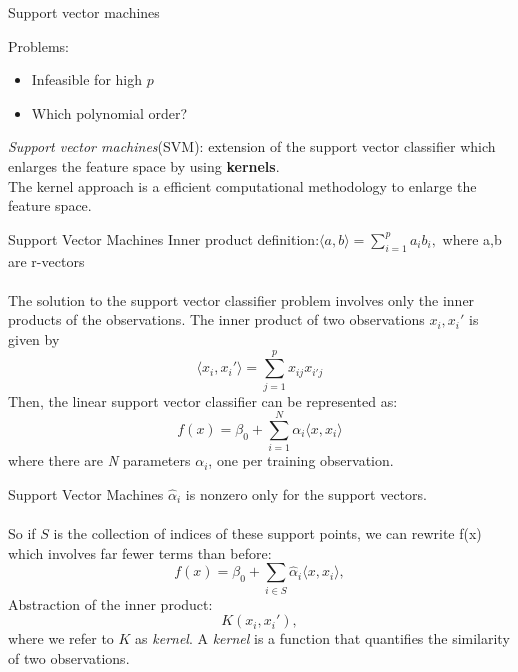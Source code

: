 \documentclass[notes]{beamer}          %
\begin{document}
\begin{frame}{Support vector machines}

Problems:
\begin{itemize}
	\item Infeasible for high $p$
	\item Which polynomial order?
\end{itemize}
\vspace{0.5cm}
\textit{Support vector machines}(SVM): extension of the support vector classifier which enlarges the feature space by using \textbf{kernels}.\\
\vspace{0.5cm}
The kernel approach is a efficient computational methodology to enlarge the feature space.


\end{frame}

\begin{frame}{Support Vector Machines}
Inner product definition:$\langle {a,b} \rangle = \sum_{i=1}^{p} a_{i}b_{i},$ where a,b are r-vectors\\~\\
The solution to the support vector classifier problem involves only the inner products of the observations. The inner product of two observations $x_i, x_i'$ is given by
\begin{equation*}
\langle {x_i,x_i'} \rangle = \sum_{j=1}^{p} x_{ij} x_{i'j}
\end{equation*}
Then, the linear support vector classifier can be represented as:
\begin{equation*}
f(x) = \beta_0 + \sum_{i=1}^{N} \alpha_i \langle {x,x_i} \rangle
\end{equation*}
where there are \textit{N} parameters $\alpha_i$, one per training observation.
\end{frame}

%


\begin{frame}{Support Vector Machines}
$\hat{\alpha}_i$ is nonzero only for the support vectors. \\~\\
So if $\mathit{S}$ is the collection of indices of these support points, we can rewrite f(x) which involves far fewer terms than before:
\begin{equation*}
f(x) = \beta_0 + \sum_{i\in\mathit{S}} \hat{\alpha}_i \langle {x,x_i} \rangle,
\end{equation*}
Abstraction of the inner product:
\begin{equation*}
\mathit{K}(x_i,x_i'),
\end{equation*}
where we refer to $\mathit{K}$ as \textit{kernel}. 
A \textit{kernel} is a function that quantifies the similarity of two observations.
\end{frame}
\end{document}
